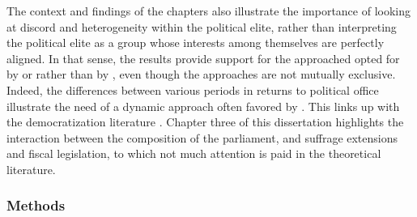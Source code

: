 The context and findings of the chapters also illustrate the importance of looking at discord and heterogeneity within the political elite, rather than interpreting the political elite as a group whose interests among themselves are perfectly aligned. In that sense, the results provide support for the approached opted for by \cite{lizzeri2004did} or \cite{llavador2005partisan} rather than by \cite{acemoglu2013political}, even though the approaches are not mutually exclusive. Indeed, the differences between various periods in returns to political office illustrate the need of a dynamic approach often favored by \cite{acemoglu2013political}. This links up with the democratization literature \citep[see e.g.][]{acemoglu2000did, acemoglu2008oligarchic,aidt2019motivates}. Chapter three of this dissertation highlights the interaction between the composition of the parliament, and suffrage extensions and fiscal legislation, to which not much attention is paid in the theoretical literature. 


\subsubsection{Methods}

